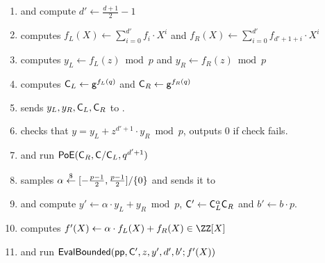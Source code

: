 \documentclass{article}
\theoremstyle{definition}
\begin{document}
\begin{mdframed}
\begin{minipage}{\textwidth}
\begin{enumerate}[nolistsep]
        \item \pcind[1] \prover and \verifier compute $d' \gets \frac{d+1}{2} - 1$
        \item \pcind[1] \prover computes $f_L(X) \gets \sum\limits_{i=0}^{d'} f_i \cdot X^i$ and $f_R(X)\gets\sum\limits_{i=0}^{d'} f_{d'+1+i}\cdot X^{i}$
        \item \pcind[1] \prover computes $y_L\gets f_L(z) \bmod p$ and $y_R\gets f_R(z)\bmod p$
        \item \pcind[1] \prover computes $\mathsf{C}_L \gets \mathsf{g}^{f_L(q)}$ and $\mathsf{C}_R \gets \mathsf{g}^{f_R(q)}$
        \item \pcind[1] \prover sends $y_L,y_R, \mathsf{C}_L, \mathsf{C}_R$ to \verifier. 
        \item \pcind[1] \verifier checks that $y=y_L+z^{d'+1}\cdot y_R \bmod p$, outputs $0$ if check fails.
        \item \pcind[1] \label{line:PoE} \prover and \verifier run $\textsf{{PoE}}(\mathsf{C}_R, \mathsf{C}/\mathsf{C}_L, q^{d'+1})$
        \item \pcind[1] \verifier samples $\alpha \overset{\$}{\gets} [-\frac{p-1}{2},\frac{p-1}{2}]/\{0\}$ and sends it to \prover
        \item \pcind[1] \prover and \verifier compute $y'\gets\alpha \cdot y_L +y_R \bmod p$, $\mathsf{C}' \gets \mathsf{C}_L^\alpha  \mathsf{C}_R$ and $b'\gets b\cdot p$. 
        \item \pcind[1] \prover computes $f'(X) \gets \alpha \cdot f_L(X) + f_R(X) \in \ZZ[X]$ 
        \item \pcind[1] \prover and \verifier run $\textsf{{EvalBounded}}(\textsf{pp}, \mathsf{C}', z, y', d',b' ; f'(X))$
               \end{enumerate}
      \end{minipage}
\end{mdframed}
\end{document}

